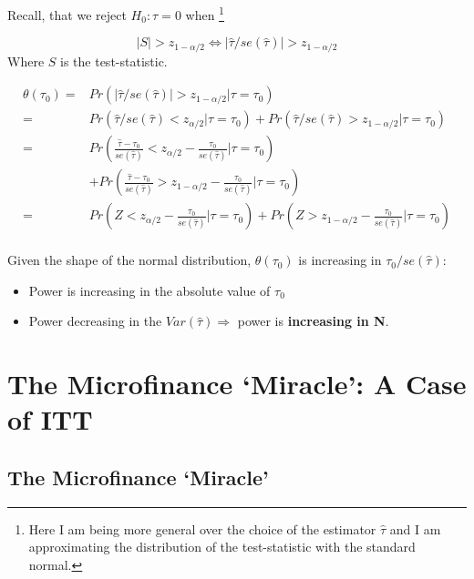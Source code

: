\documentclass[
  letterpaper,
  DIV=11,
  numbers=noendperiod]{scrreprt}
\providecommand{\tightlist}{%
  \setlength{\itemsep}{0pt}\setlength{\parskip}{0pt}}\usepackage{longtable,booktabs,array}
\theoremstyle{definition}
\theoremstyle{remark}
\begin{document}
Recall, that we reject \(H_0: \tau=0\) when \footnote{Here I am being
  more general over the choice of the estimator \(\hat{\tau}\) and I am
  approximating the distribution of the test-statistic with the standard
  normal.}

\[
            |S|>z_{1-\alpha/2}\Longleftrightarrow |\hat{\tau}/se(\hat{\tau})|>z_{1-\alpha/2}
\] Where \(S\) is the test-statistic.

\[
        \begin{align*}
            \theta(\tau_0)=&Pr(|\hat{\tau}/se(\hat{\tau})|>z_{1-\alpha/2}|\tau=\tau_0) \\
            =&Pr(\hat{\tau}/se(\hat{\tau})<z_{\alpha/2}|\tau=\tau_0)+Pr(\hat{\tau}/se(\hat{\tau})>z_{1-\alpha/2}|\tau=\tau_0) \\
            =&Pr\left(\frac{\hat{\tau}-\tau_0}{se(\hat{\tau})}<z_{\alpha/2}-\frac{\tau_0}{se(\hat{\tau})}|\tau=\tau_0\right)\\
            &+Pr\left(\frac{\hat{\tau}-\tau_0}{se(\hat{\tau})}>z_{1-\alpha/2}-\frac{\tau_0}{se(\hat{\tau})}|\tau=\tau_0\right) \\
            =&Pr\left(Z<z_{\alpha/2}-\frac{\tau_0}{se(\hat{\tau})}|\tau=\tau_0\right)+Pr\left(Z>z_{1-\alpha/2}-\frac{\tau_0}{se(\hat{\tau})}|\tau=\tau_0\right)
        \end{align*}
\]\\
Given the shape of the normal distribution, \(\theta(\tau_0)\) is
increasing in \(\tau_0/se(\hat{\tau})\):

\par

\begin{itemize}
\tightlist
\item
  Power is increasing in the absolute value of \(\tau_0\)
\item
  Power decreasing in the \(Var(\hat{\tau})\Rightarrow\) power is
  \textbf{increasing in N}.
\end{itemize}

\hypertarget{the-microfinance-miracle-a-case-of-itt}{%
\section{The Microfinance `Miracle': A Case of
ITT}\label{the-microfinance-miracle-a-case-of-itt}}

\hypertarget{the-microfinance-miracle}{%
\subsection{The Microfinance `Miracle'}\label{the-microfinance-miracle}}
\end{document}
